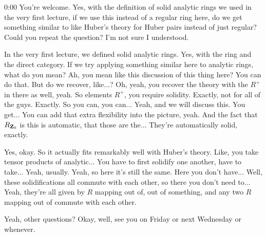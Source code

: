 \begin{unfinished}{0:00}
You're welcome. Yes, with the definition of solid analytic rings we used in the very first lecture, if we use this instead of a regular ring here, do we get something similar to like Huber's theory for Huber pairs instead of just regular? Could you repeat the question? I'm not sure I understood.

In the very first lecture, we defined solid analytic rings. Yes, with the ring and the direct category. If we try applying something similar here to analytic rings, what do you mean? Ah, you mean like this discussion of this thing here? You can do that. But do we recover, like...? Oh, yeah, you recover the theory with the $R^+$ in there as well, yeah. So elements $R^+$, you require solidity. Exactly, not for all of the guys. Exactly. So you can, you can... Yeah, and we will discuss this. You get... You can add that extra flexibility into the picture, yeah. And the fact that $R_{\mathbf Z_0}$ is this is automatic, that those are the... They're automatically solid, exactly.

Yes, okay. So it actually fits remarkably well with Huber's theory. Like, you take tensor products of analytic... You have to first solidify one another, have to take... Yeah, usually. Yeah, so here it's still the same. Here you don't have... Well, these solidifications all commute with each other, so there you don't need to... Yeah, they're all given by $R$ mapping out of, out of something, and any two $R$ mapping out of commute with each other.

Yeah, other questions? Okay, well, see you on Friday or next Wednesday or whenever.

\end{unfinished}